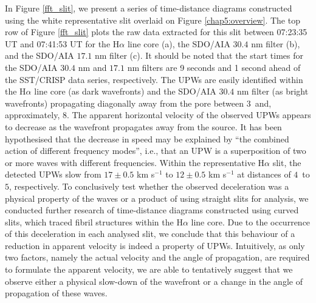 	In Figure \ref{fft_slit}, we present a series of time-distance diagrams constructed using the white representative slit overlaid on Figure \ref{chap5:overview}.
	The top row of Figure \ref{fft_slit} plots the raw data extracted for this slit between 07:23:35 UT and 07:41:53 UT for the H$\alpha$ line core (a), the SDO/AIA $30.4$ nm filter (b), and the SDO/AIA $17.1$ nm filter (c).
	It should be noted that the start times for the SDO/AIA $30.4$ nm and $17.1$ nm filters are 9 seconds and 1 second ahead of the SST/CRISP data series, respectively.
	The UPWs are easily identified within the H$\alpha$ line core (as dark wavefronts) and the SDO/AIA $30.4$ nm filter (as bright wavefronts) propagating diagonally away from the pore between $3$\arcsecs\ and, approximately, $8$\arcsecs.
	The apparent horizontal velocity of the observed UPWs appears to decrease as the wavefront propagates away from the source.
	It has been hypothesised that the decrease in speed may be explained by ``the combined action of different frequency modes''\citep{UTMO}, i.e., that an UPW is a superposition of two or more waves with different frequencies.
	Within the representative H$\alpha$ slit, the detected UPWs slow from $17\pm0.5$ km s$^{-1}$ to $12\pm0.5$ km s$^{-1}$ at distances of $4$\arcsecs\ to $5$\arcsecs, respectively.
	To conclusively test whether the observed deceleration was a physical property of the waves or a product of using straight slits for analysis, we conducted further research of time-distance diagrams constructed using curved slits, which traced fibril 	structures within the H$\alpha$ line core.
	Due to the occurrence of this deceleration in each analysed slit, we conclude that this behaviour of a reduction in apparent velocity is indeed a property of UPWs.
	Intuitively, as only two factors, namely the actual velocity and the angle of propagation, are required to formulate the apparent velocity, we are able to tentatively suggest that we observe either a physical slow-down of the wavefront or a change in the angle of propagation of these waves.

